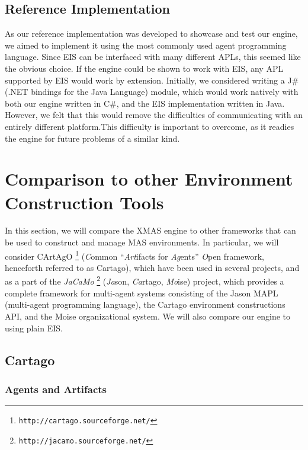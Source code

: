 \subsection*{Reference Implementation}

As our reference implementation was developed to showcase and test
our engine, we aimed to implement it using the most commonly used
agent programming language. Since EIS can be interfaced with many
different APLs, this seemed like the obvious choice. If the engine
could be shown to work with EIS, any APL supported by EIS would work
by extension. Initially, we considered writing a J\# (.NET bindings
for the Java Language) module, which would work natively with both
our engine written in C\#, and the EIS implementation written in Java.
However, we felt that this would remove the difficulties of communicating
with an entirely different platform.This difficulty is important to
overcome, as it readies the engine for future problems of a similar
kind. 


\section{Comparison to other Environment Construction Tools\label{sec:DiscussionComparison}}

In this section, we will compare the XMAS engine to other frameworks
that can be used to construct and manage MAS environments. In particular,
we will consider CArtAgO%
\footnote{\texttt{http://cartago.sourceforge.net/}%
} (\emph{C}ommon ``\emph{Art}ifacts for \emph{Ag}ents'' \emph{O}pen
framework, henceforth referred to as Cartago), which have been used
in several projects, and as a part of the \emph{JaCaMo}%
\footnote{\texttt{http://jacamo.sourceforge.net/}%
} (\emph{Ja}son, \emph{Ca}rtago, \emph{Mo}ise) project, which provides
a complete framework for multi-agent systems consisting of the Jason
MAPL (multi-agent programming language), the Cartago environment constructions
API, and the Moise organizational system. We will also compare our
engine to using plain EIS.


\subsection{Cartago}


\subsubsection*{Agents and Artifacts}

